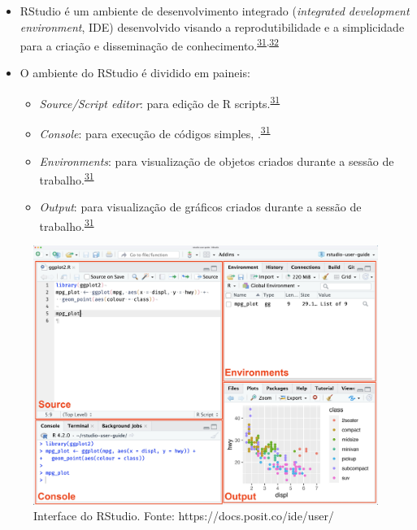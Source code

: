 \documentclass[
  a4paper,
]{book}
\begin{document}
\begin{itemize}
\item
  RStudio é um ambiente de desenvolvimento integrado (\emph{integrated development environment}, IDE) desenvolvido visando a reprodutibilidade e a simplicidade para a criação e disseminação de conhecimento.\textsuperscript{\protect\hyperlink{ref-introduc2020}{31},\protect\hyperlink{ref-racine2011}{32}}
\item
  O ambiente do RStudio é dividido em paineis:

  \begin{itemize}
  \item
    \emph{Source/Script editor}: para edição de R scripts.\textsuperscript{\protect\hyperlink{ref-introduc2020}{31}}
  \item
    \emph{Console}: para execução de códigos simples, .\textsuperscript{\protect\hyperlink{ref-introduc2020}{31}}
  \item
    \emph{Environments}: para visualização de objetos criados durante a sessão de trabalho.\textsuperscript{\protect\hyperlink{ref-introduc2020}{31}}
  \item
    \emph{Output}: para visualização de gráficos criados durante a sessão de trabalho.\textsuperscript{\protect\hyperlink{ref-introduc2020}{31}}
  \end{itemize}
\end{itemize}

\begin{figure}

{\centering \includegraphics[width=1\linewidth]{images/RStudioConsole} 

}

\caption{Interface do RStudio. Fonte: https://docs.posit.co/ide/user/}\label{fig:rstudio-interface}
\end{figure}
\end{document}
